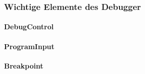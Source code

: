 \documentclass[parskip=full]{scrartcl}
\begin{document}
\subsubsection{Wichtige Elemente des Debugger}
\paragraph{DebugControl}
\paragraph{ProgramInput}
\paragraph{Breakpoint}
\end{document}

